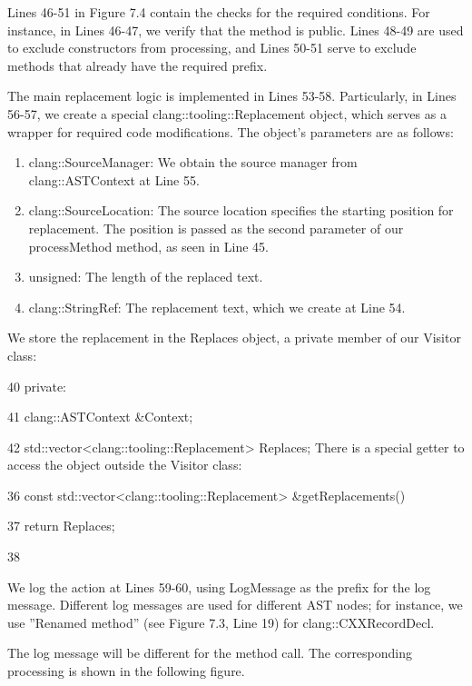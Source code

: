 Lines 46-51 in Figure 7.4 contain the checks for the required conditions. For instance, in Lines 46-47, we verify that the method is public. Lines 48-49 are used to exclude constructors from processing, and Lines 50-51 serve to exclude methods that already have the required prefix.

The main replacement logic is implemented in Lines 53-58. Particularly, in Lines 56-57, we create a special clang::tooling::Replacement object, which serves as a wrapper for required code modifications. The object’s parameters are as follows:

\begin{enumerate}
\item
clang::SourceManager: We obtain the source manager from clang::ASTContext at Line 55.

\item
clang::SourceLocation: The source location specifies the starting position for replacement. The position is passed as the second parameter of our processMethod method, as seen in Line 45.

\item
unsigned: The length of the replaced text.

\item
clang::StringRef: The replacement text, which we create at Line 54.
\end{enumerate}

We store the replacement in the Replaces object, a private member of our Visitor class:

\begin{cpp}
40 private:

41   clang::ASTContext &Context;


42   std::vector<clang::tooling::Replacement> Replaces;
There is a special getter to access the object outside the Visitor class:

36   const std::vector<clang::tooling::Replacement> &getReplacements() {


37     return Replaces;

38   }
\end{cpp}

We log the action at Lines 59-60, using LogMessage as the prefix for the log message. Different log messages are used for different AST nodes; for instance, we use ”Renamed method” (see Figure 7.3, Line 19) for clang::CXXRecordDecl.

The log message will be different for the method call. The corresponding processing is shown in the following figure.

